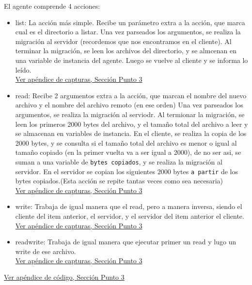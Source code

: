 \documentclass[12pt,journal,compsoc]{IEEEtran}
\begin{document}
El agente comprende 4 acciones:
\begin{itemize}
  \item list: La acción más simple. Recibe un parámetro extra a la acción,
        que marca cual es el directorio a listar.
        Una vez parseados los argumentos, se realiza la migración al servidor
        (recordemos que nos encontramos en el cliente).
        Al terminar la migración, se leen los archivos del directorio, y se
        almcenan en una variable de instancia del agente. Luego se vuelve al
        cliente y se informa lo leído.\\
        \hyperref[fig:list]{Ver apéndice de capturas, Sección Punto 3}

  \item read: Recibe 2 argumentos extra a la acción, que marcan el nombre del
        nuevo archivo y el nombre del archivo remoto (en ese orden)
        Una vez parseados los argumentos, se realiza la migración al serviodr.
        Al termionar la migración, se leen los primeros 2000 bytes del archivo,
        y el tamaño total del archivo a leer y se almacenan en variables de instancia.
        En el cliente, se realiza la copia de los 2000 bytes, y se consulta si el
        tamaño total del archivo es menor o igual al tamaño copiado (en la primer
        vuelta va a ser igual a 2000), de no ser asi, se suman a una variable de
        \texttt{bytes copiados}, y se realiza la migración al servidor.
        En el servidor se copian los siguientes 2000 bytes \texttt{a partir}
        de los bytes copiados.(Esta acción se repite tantas veces como 
        sea necesaria)\\
        \hyperref[fig:initial-file]{Ver apéndice de capturas, Sección Punto 3}
  
  \item write: Trabaja de igual manera que el read, pero a manera inversa,
        siendo el cliente del item anterior, el servidor, y el servidor del item
        anterior el cliente.\\
        \hyperref[fig:initial-file]{Ver apéndice de capturas, Sección Punto 3}
  \item readwrite: Trabaja de igual manera que ejecutar primer un read y lugo un
        write de ese archivo.\\
        \hyperref[fig:start-read2]{Ver apéndice de capturas, Sección Punto 3}
\end{itemize}

\hyperref[section:code-punto3]{Ver apéndice de código, Sección Punto 3}
\end{document}
